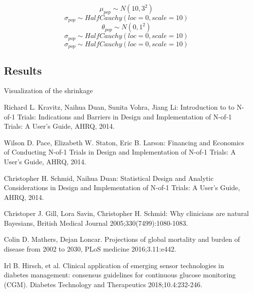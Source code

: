 \documentclass[12pt,a4paper,leqno]{report}
\theoremstyle{plain}
\theoremstyle{definition}
\theoremstyle{remark}
\begin{document}
\begin{def}\label{population_priors}
    \begin{equation}\label{}
        \mu_{pop} \sim N(10, 3^2)
    \end{equation}
    \begin{equation}\label{}
        \sigma_{pop} \sim HalfCauchy(loc=0, scale=10)
    \end{equation}
    \begin{equation}\label{}
        \theta_{pop} \sim N(0, 1^2)
    \end{equation}
    \begin{equation}\label{}
        \sigma_{pop} \sim HalfCauchy(loc=0, scale=10)
    \end{equation}
    \begin{equation}\label{}
        \sigma_{pop} \sim HalfCauchy(loc=0, scale=10)
    \end{equation}
\end{def}

\subsection{Results}\label{hierresults}

Visualization of the shrinkage


\begin{thebibliography}{4}

    Richard L. Kravitz, Naihua Duan, Sunita Vohra, Jiang Li: Introduction to to N-of-1 Trials: Indications and Barriers in Design and Implementation of N-of-1 Trials: A User's Guide, AHRQ, 2014.

    Wilson D. Pace, Elizabeth W. Staton, Eric B. Larson: Financing and Economics of Conducting N-of-1 Trials in Design and Implementation of N-of-1 Trials: A User's Guide, AHRQ, 2014.

    Christopher H. Schmid, Naihua Duan: Statistical Design and Analytic Considerations in Design and Implementation of N-of-1 Trials: A User's Guide, AHRQ, 2014.

    Christoper J. Gill, Lora Savin, Christopher H. Schmid: Why clinicians are natural Bayesians, British Medical Journal 2005;330(7499):1080-1083.

    Colin D. Mathers, Dejan Loncar. Projections of global mortality and burden of disease from 2002 to 2030, PLoS medicine 2016;3.11:e442.

    Irl B. Hirsch, et al. Clinical application of emerging sensor technologies in diabetes management: consensus guidelines for continuous glucose monitoring (CGM). Diabetes Technology and Therapeutics 2018;10.4:232-246.

\end{thebibliography}
\end{document}
